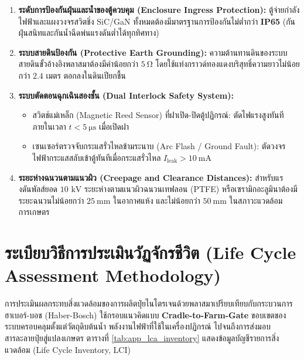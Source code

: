 \begin{enumerate}[leftmargin=2.0em, itemsep=4pt]
    \item \textbf{ระดับการป้องกันฝุ่นและน้ำของตู้ควบคุม (Enclosure Ingress Protection):} ตู้จ่ายกำลังไฟฟ้าและแผงวงจรสวิตชิ่ง SiC/GaN ทั้งหมดต้องมีมาตรฐานการป้องกันไม่ต่ำกว่า \textbf{IP65} (กันฝุ่นสนิทและกันน้ำฉีดพ่นแรงดันต่ำได้ทุกทิศทาง)
    \item \textbf{ระบบสายดินป้องกัน (Protective Earth Grounding):} ความต้านทานดินของระบบสายดินขั้วอ้างอิงพลาสมาต้องมีค่าน้อยกว่า \textbf{$5\ \si{\ohm}$} โดยใช้แท่งกราวด์ทองแดงบริสุทธิ์ความยาวไม่น้อยกว่า $2.4\text{ เมตร}$ ตอกลงในดินเปียกชื้น
    \item \textbf{ระบบตัดตอนฉุกเฉินสองชั้น (Dual Interlock Safety System):}
    \begin{itemize}
        \item สวิตช์แม่เหล็ก (Magnetic Reed Sensor) ที่ฝาเปิด-ปิดตู้ปฏิกรณ์: ตัดไฟแรงสูงทันทีภายในเวลา $t < 5\ \si{\micro\second}$ เมื่อเปิดฝา
        \item เซนเซอร์ตรวจจับกระแสรั่วไหลข้ามระนาบ (Arc Flash / Ground Fault): ตัดวงจรไฟฟ้ากระแสสลับเข้าตู้ทันทีเมื่อกระแสรั่วไหล $I_{\text{leak}} > 10\ \si{\milli\ampere}$
    \end{itemize}
    \item \textbf{ระยะห่างฉนวนตามแนวผิว (Creepage and Clearance Distances):} สำหรับแรงดันพัลส์ยอด $10\text{ kV}$ ระยะห่างตามแนวผิวฉนวนเทฟลอน (PTFE) หรือเซรามิกอะลูมินาต้องมีระยะฉนวนไม่น้อยกว่า $25\ \si{\milli\meter}$ ในอากาศแห้ง และไม่น้อยกว่า $50\ \si{\milli\meter}$ ในสภาวะแวดล้อมการเกษตร
\end{enumerate}

\section{ระเบียบวิธีการประเมินวัฏจักรชีวิต (Life Cycle Assessment Methodology)}
\label{app:sec_lca_methods}

การประเมินผลกระทบสิ่งแวดล้อมของการผลิตปุ๋ยไนโตรเจนด้วยพลาสมาเปรียบเทียบกับกระบวนการฮาเบอร์-บอช (Haber-Bosch) ใช้กรอบแนวคิดแบบ \textbf{Cradle-to-Farm-Gate} ขอบเขตของระบบครอบคลุมตั้งแต่วัตถุดิบต้นน้ำ พลังงานไฟฟ้าที่ใช้ในเครื่องปฏิกรณ์ ไปจนถึงการส่งมอบสารละลายปุ๋ยสู่แปลงเกษตร ตารางที่ \ref{tab:app_lca_inventory} แสดงข้อมูลบัญชีรายการสิ่งแวดล้อม (Life Cycle Inventory, LCI)

